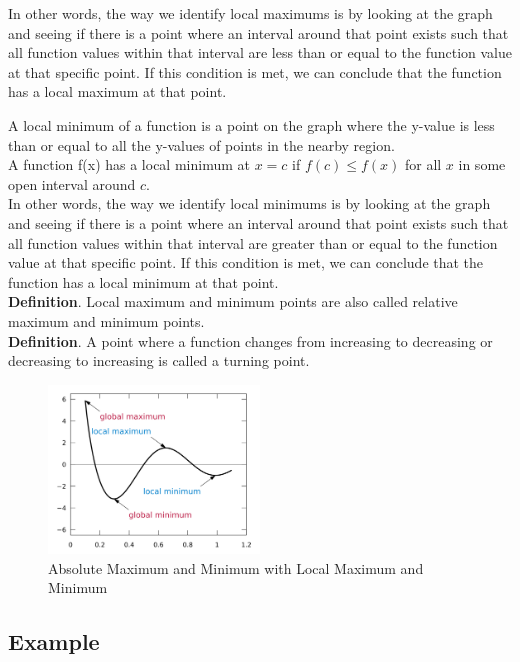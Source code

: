 In other words, the way we identify local maximums is by looking at the graph and seeing if there is a point where an interval around that point exists such that all function values within that interval are less than or equal to the function value at that specific point. If this condition is met, we can conclude that the function has a local maximum at that point.

A local minimum of a function is a point on the graph where the y-value is less than or equal to all the y-values of points in the nearby region. \\
A function f(x) has a local minimum at $x = c$ if $f(c) \le f(x)$ for all $x$ in some open interval around $c$. \\
In other words, the way we identify local minimums is by looking at the graph and seeing if there is a point where an interval around that point exists such that all function values within that interval are greater than or equal to the function value at that specific point. If this condition is met, we can conclude that the function has a local minimum at that point. \\

\textbf{Definition}. Local maximum and minimum points are also called relative maximum and minimum points. \\
\textbf{Definition}. A point where a function changes from increasing to decreasing or decreasing to increasing is called a turning point. \\

\newpage
\begin{figure}
	\centering
	\includegraphics[width=0.5\textwidth]{algebra-pre-calculus/algebra/functions/graph7.png}
	\caption{Absolute Maximum and Minimum with Local Maximum and Minimum}
\end{figure}

\subsection{Example}


